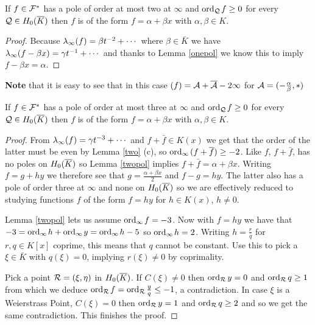 \documentclass[english,11pt,a4paper]{article}
\begin{document}
\begin{lemma}\label{twopol}
  If $f \in \mathcal{F}^*$ has a pole of order at most two at $\infty$ and $\text{ord}_{\mathcal{Q}}\hspace{0.4mm} f \geq 0$ for every $\mathcal{Q} \in H_0(\overline K)$ then $f$ is of the form $f = \alpha + \beta x$ with $\alpha, \beta \in K$.
  \begin{proof}
    Because $\lambda_{\infty} (f) = \beta t^{-2} + \cdots$ where $\beta \in \bar K$ we have $\lambda_{\infty} (f - \beta x)= \gamma t^{-1} + \cdots$ and thanks to Lemma \ref{onepol} we know this to imply $f - \beta x = \alpha$.
  \end{proof}
  \textbf{Note} that it is easy to see that in this case $(f) = \mathcal{A} + \overline {\mathcal{A}} -2 \infty$ for $\mathcal{A} = ( - \frac \alpha \beta , * )$
\end{lemma}

\begin{lemma}\label{threepol}
  If $f \in \mathcal{F}^*$ has a pole of order at most three at $\infty$ and $\text{ord}_{\mathcal{Q}}\hspace{0.4mm} f \geq 0$ for every $\mathcal{Q} \in H_0(\overline K)$ then $f$ is of the form $f = \alpha + \beta x$ with $\alpha, \beta \in K$.
  \begin{proof}
    From $\lambda_{\infty} (f) = \gamma t^{-3} + \cdots$ and $f + \bar f \in K(x)$ we get that the order of the latter must be even by Lemma \ref{two} (c), so $\text{ord}_{\infty}\hspace{0.4mm} (f+ \overline f)  \geq -2$. Like $f$, $f + \bar f$, has no poles on $H_0(\overline K)$ so Lemma \ref{twopol} implies $f + \bar f = \alpha + \beta x$. Writing $f = g + hy$ we therefore see that $g = \frac{\alpha + \beta x}{2}$ and $f - g = hy$. The latter also has a pole of order three at $\infty$ and none on $H_0(\overline K)$ so we are effectively reduced to studying functions $f$ of the form $f = hy$ for $h \in K(x)$, $h \neq 0$.

    Lemma \ref{twopol} lets us assume $\text{ord}_{\infty}\hspace{0.4mm} f = -3$. Now with $f = h y$ we have that $-3 = \text{ord}_{\infty}\hspace{0.4mm} h + \text{ord}_{\infty}\hspace{0.4mm} y = \text{ord}_{\infty}\hspace{0.4mm} h - 5$ so $\text{ord}_{\infty}\hspace{0.4mm} h = 2$. Writing $h = \frac r q$ for $r, q \in K[x]$ coprime, this means that $q$ cannot be constant. Use this to pick a $\xi \in \bar K$ with $q(\xi) = 0$, implying $r(\xi) \neq 0$ by coprimality.

    Pick a point $\mathcal{R} = (\xi, \eta)$ in $H_0(\overline K)$. If $C(\xi) \neq 0$ then $\text{ord}_{\mathcal{R}} \hspace{0.5mm} y = 0$ and $\text{ord}_{\mathcal{R}} \hspace{0.5mm} q \geq 1$ from which we deduce $\text{ord}_{\mathcal{R}} \hspace{0.4mm} f = \text{ord}_{\mathcal{R}} \hspace{0.4mm} \frac y q \leq -1$, a contradiction. In case $\xi$ is a Weierstrass Point, $C(\xi) = 0$ then $\text{ord}_{\mathcal{R}} \hspace{0.5mm} y = 1$ and $\text{ord}_{\mathcal{R}} \hspace{0.5mm} q \geq 2$ and so we get the same contradiction. This finishes the proof.
  \end{proof}
\end{lemma}
\end{document}

